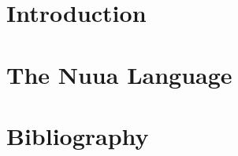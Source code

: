 


\pagestyle{plain}



\tableofcontents
\listoffigures

\clearpage
\fancyhead[L]{\scriptsize{\textsl{\leftmark}}}
\fancyhead[R]{\scriptsize{\textsl{\rightmark}}}

\chapter{Introduction}


\chapter{The Nuua Language}


\chapter{Bibliography}
\printbibliography[heading=none]


